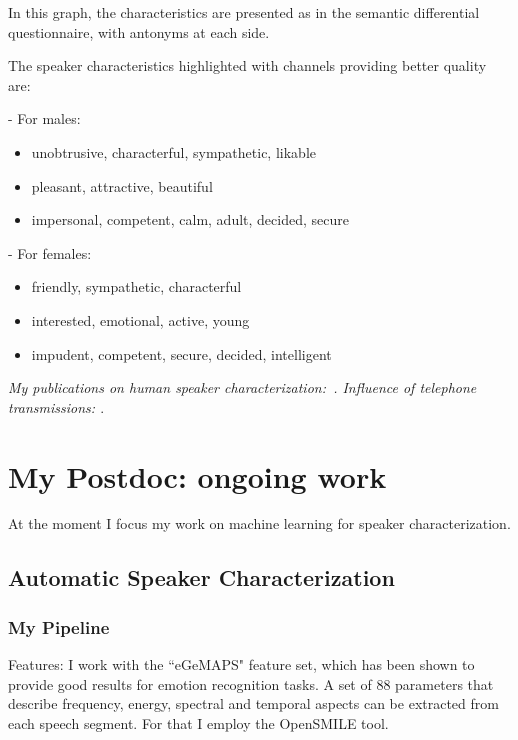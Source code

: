 \documentclass[a4paper]{article}
\begin{document}
In this graph, the characteristics are presented as in the semantic differential questionnaire, with antonyms at each side.

The speaker characteristics highlighted with channels providing better quality are:
 
- For males: 

\begin{itemize}
	\item unobtrusive, characterful, sympathetic, likable 
	\item pleasant, attractive, beautiful
	\item impersonal, competent, calm, adult, decided, secure
\end{itemize}

- For females:

\begin{itemize}
	\item friendly, sympathetic, characterful
	\item interested, emotional, active, young
	\item impudent, competent, secure, decided, intelligent	
\end{itemize}


\textit{My publications on human speaker characterization:~\cite{my18, my21, my24, my25, my30}. Influence of telephone transmissions: \cite{my17, my34, my35}}.



\section{My Postdoc: ongoing work}

At the moment I focus my work on machine learning for speaker characterization.

\subsection{Automatic Speaker Characterization}


\subsubsection{My Pipeline}

Features: I work with the ``eGeMAPS" feature set, which has been shown to provide good results for emotion recognition tasks. A set of 88 parameters that describe frequency, energy, spectral and temporal aspects can be extracted from each speech segment. For that I employ the OpenSMILE tool.
\end{document}
